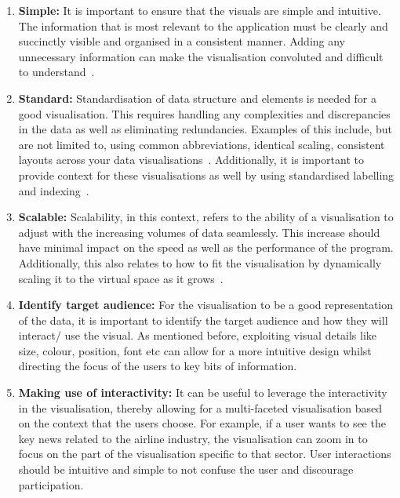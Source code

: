 \begin{enumerate}
\item \textbf{Simple:}
It is important to ensure that the visuals are simple and intuitive. The information that is most relevant to the application must be clearly and succinctly visible and organised in a consistent manner. Adding any unnecessary information can make the visualisation convoluted and difficult to understand~\cite{29_bhalla_2022}. 

\item \textbf{Standard:}
Standardisation of data structure and elements is needed for a good visualisation. This requires handling any complexities and discrepancies in the data as well as eliminating redundancies. Examples of this include, but are not limited to, using common abbreviations, identical scaling, consistent layouts across your data visualisations~\cite{29_bhalla_2022}. Additionally, it is important to provide context for these visualisations as well by using standardised labelling and indexing~\cite{30_vis}.

\item \textbf{Scalable:}
Scalability, in this context, refers to the ability of a visualisation to adjust with the increasing volumes of data seamlessly. This increase should have minimal impact on the speed as well as the performance of the program. Additionally, this also relates to how to fit the visualisation by dynamically scaling it to the virtual space as it grows~\cite{29_bhalla_2022}. 

\item \textbf{Identify target audience:}
 For the visualisation to be a good representation of the data, it is important to identify the target audience and how they will interact/ use the visual. As mentioned before, exploiting visual details like size, colour, position, font etc can allow for a more intuitive design whilst directing the focus of the users to key bits of information\cite{30_vis}. 

\item \textbf{Making use of interactivity:}
It can be useful to leverage the interactivity in the visualisation, thereby allowing for a multi-faceted visualisation based on the context that the users choose. For example, if a user wants to see the key news related to the airline industry, the visualisation can zoom in to focus on the part of the visualisation specific to that sector. User interactions should be intuitive and simple to not confuse the user and discourage participation. 

\end{enumerate}


